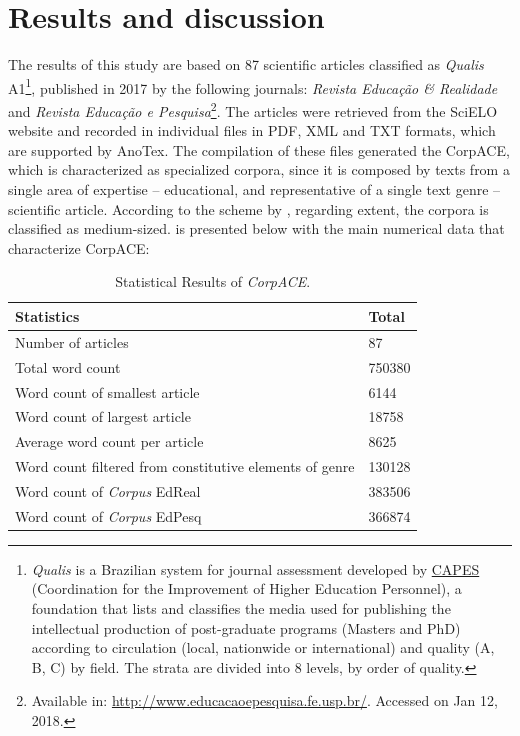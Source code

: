\documentclass[english]{textolivre}
\begin{document}
\section{Results and discussion}\label{sec-format-simple}
The results of this study are based on 87 scientific articles classified as \textit{Qualis} A1\footnote{\textit{Qualis} is a Brazilian system for journal assessment developed by \href{https://pt.wikipedia.org/wiki/Coordenação_de_Aperfeiçoamento_de_Pessoal_de_Nível_Superior}{CAPES} (Coordination for the Improvement of Higher Education Personnel), a foundation that lists and classifies the media used for publishing the intellectual production of post-graduate programs (Masters and PhD) according to circulation (local, nationwide or international) and quality (A, B, C) by field. The strata are divided into 8 levels, by order of quality.}, published in 2017 by the following journals: \textit{Revista Educação \& Realidade} and \textit{Revista Educação e Pesquisa}\footnote{Available in: \url{http://www.educacaoepesquisa.fe.usp.br/}. Accessed on Jan 12, 2018.}. The articles were retrieved from the SciELO website and recorded in individual files in PDF, XML and TXT formats, which are supported by AnoTex. The compilation of these files generated the CorpACE, which is characterized as specialized corpora, since it is composed by texts from a single area of expertise – educational, and representative of a single text genre – scientific article. According to the scheme by \textcite{sardinha_linguistica_2004}, regarding extent, the corpora is classified as medium-sized.  is presented below with the main numerical data that characterize CorpACE:

\begin{table}[htbp]
\begin{center}
\caption{Statistical Results of \textit{CorpACE}.}
\label{tbl03}
\begin{tabular}{ll}
 \toprule 
\textbf{Statistics}         &        \textbf{Total} \\ \hline                          
Number of articles         &         87                              \\
Total word count   &                 750380                          \\
Word count of smallest article    &  6144                            \\
Word count of largest article  &     18758                           \\
Average word count per article          &         8625               \\
Word count filtered from constitutive elements of genre    &   130128 \\
Word count of \textit{Corpus} EdReal     &  383506                             \\
Word count of \textit{Corpus} EdPesq   &     366874                            \\ \hline 
\end{tabular}
\end{center}
\end{table}
\end{document}
